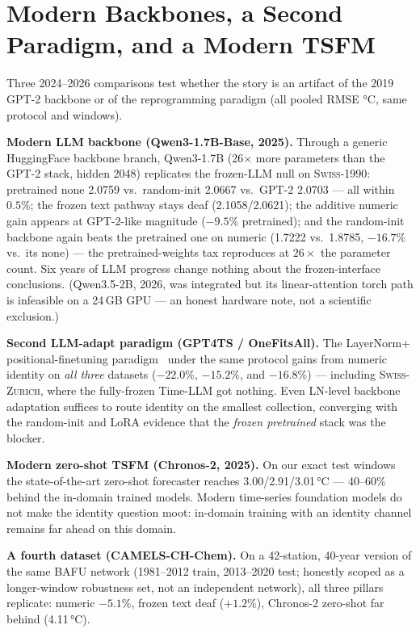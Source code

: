\documentclass[sigconf,review]{acmart}
\newcommand{\swiss}{\textsc{Swiss-1990}}
\newcommand{\swissc}{\textsc{Swiss-Zurich}}
\begin{document}
\section{Modern Backbones, a Second Paradigm, and a Modern TSFM}
\label{sec:modern}

Three 2024--2026 comparisons test whether the story is an artifact of the 2019
GPT-2 backbone or of the reprogramming paradigm (all pooled RMSE °C, same
protocol and windows).

\textbf{Modern LLM backbone (Qwen3-1.7B-Base, 2025).} Through a generic
HuggingFace backbone branch, Qwen3-1.7B (26$\times$ more parameters than the
GPT-2 stack, hidden 2048) replicates the frozen-LLM null on \swiss{}: pretrained
\textsf{none} 2.0759 vs.\ random-init 2.0667 vs.\ GPT-2 2.0703 --- all within
$0.5\%$; the frozen text pathway stays deaf (2.1058/2.0621); the additive
numeric gain appears at GPT-2-like magnitude ($-9.5\%$ pretrained); and the
random-init backbone again beats the pretrained one on \textsf{numeric}
(1.7222 vs.\ 1.8785, $-16.7\%$ vs.\ its \textsf{none}) --- the
pretrained-weights tax reproduces at $26\times$ the parameter count. Six years of
LLM progress change nothing about the frozen-interface conclusions. (Qwen3.5-2B,
2026, was integrated but its linear-attention torch path is infeasible on a
24\,GB GPU --- an honest hardware note, not a scientific exclusion.)

\textbf{Second LLM-adapt paradigm (GPT4TS / OneFitsAll).} The LayerNorm{+}%
positional-finetuning paradigm~\cite{zhou2023onefitsall} under the same protocol
gains from numeric identity on \emph{all three} datasets ($-22.0\%$, $-15.2\%$,
and $-16.8\%$) --- including \swissc{}, where the fully-frozen Time-LLM got nothing.
Even LN-level backbone adaptation suffices to route identity on the smallest
collection, converging with the random-init and LoRA evidence that the
\emph{frozen pretrained} stack was the blocker.

\textbf{Modern zero-shot TSFM (Chronos-2, 2025).} On our exact test windows the
state-of-the-art zero-shot forecaster reaches 3.00/2.91/3.01\,°C --- 40--60\%
behind the in-domain trained models. Modern time-series foundation models do not
make the identity question moot: in-domain training with an identity channel
remains far ahead on this domain.

\textbf{A fourth dataset (CAMELS-CH-Chem).} On a 42-station, 40-year version of
the same BAFU network (1981--2012 train, 2013--2020 test; honestly scoped as a
longer-window robustness set, not an independent network), all three pillars
replicate: numeric $-5.1\%$, frozen text deaf ($+1.2\%$), Chronos-2 zero-shot
far behind (4.11\,°C).
\end{document}
